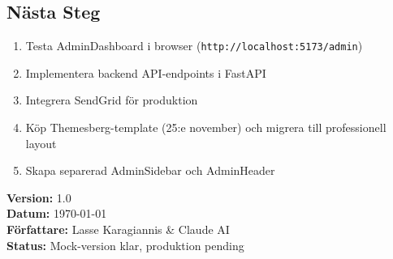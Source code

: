 \documentclass[12pt,a4paper]{article}
\begin{document}
\subsection{Nästa Steg}
\begin{enumerate}
  \item Testa AdminDashboard i browser (\texttt{http://localhost:5173/admin})
  \item Implementera backend API-endpoints i FastAPI
  \item Integrera SendGrid för produktion
  \item Köp Themesberg-template (25:e november) och migrera till professionell layout
  \item Skapa separerad AdminSidebar och AdminHeader
\end{enumerate}

\vspace{1cm}
\noindent\textbf{Version:} 1.0\\
\textbf{Datum:} \today\\
\textbf{Författare:} Lasse Karagiannis \& Claude AI\\
\textbf{Status:} Mock-version klar, produktion pending
\end{document}
